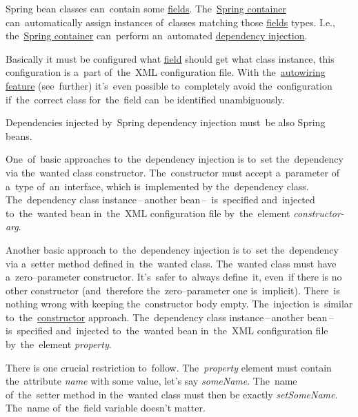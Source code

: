 \label{springdependencyinjection}
Spring bean classes can~contain some \hyperref[variablefieldproperty]{fields}. The~\hyperref[springcontainrer]{Spring container} can~automatically assign instances of~classes matching those \hyperref[variablefieldproperty]{fields} types. I.e., the~\hyperref[springcontainrer]{Spring container} can~perform an~automated \hyperref[dependencyinjection]{dependency injection}.

Basically it must be configured what \hyperref[variablefieldproperty]{field} should get what class instance, this configuration is a~part of~the~XML configuration file. With the~\hyperref[autowiring]{autowiring feature} (see~further) it's~even possible to~completely avoid the~configuration if~the~correct class for~the~field can~be identified unambiguously.

\note Dependencies injected by~Spring dependency injection must~be also Spring beans.

\label{constructorinjection}
One~of~basic approaches to~the~dependency injection is to~set the~dependency via the~wanted class constructor. The~constructor must accept a~parameter of a~type of~an~interface, which is~implemented by the~dependency class. The~dependency class instance\,--\,another bean\,--\, is~specified and~injected to~the~wanted bean in~the~XML configuration file by~the~element \textit{constructor-arg}.

\label{setterinjection}
Another basic approach to~the~dependency injection is to~set the~dependency via a~setter method defined in~the~wanted class. The~wanted class must have a~zero--parameter constructor. It's~safer to~always define~it, even~if there is no other constructor (and~therefore the~zero--parameter one is~implicit). There~is nothing wrong with keeping the~constructor body empty. The~injection is~similar to~the~\hyperref[constructorinjection]{constructor} approach. The~dependency class instance\,--\,another bean\,--\, is~specified and~injected to~the~wanted bean in~the~XML configuration file by~the~element \textit{property}.

\warning There is one crucial restriction to~follow. The~\textit{property} element must contain the~attribute \textit{name} with some value, let's say \textit{someName}. The~name of~the~setter method in the~wanted class must then be exactly \textit{setSomeName}. The~name of~the~field variable doesn't matter.

